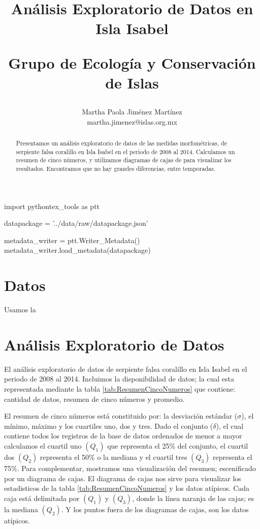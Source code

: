 \documentclass{article}
\begin{document}
 

\author{Martha Paola Jiménez Martínez \\ 
\small{martha.jimenez@islas.org.mx}} 
\title{Análisis Exploratorio de Datos en Isla Isabel \\
\begin{large} Grupo de Ecología y Conservación de Islas \end{large}}  

\maketitle

\begin{abstract}
Presentamos un análisis exploratorio de datos de las medidas morfométricas, de serpiente falsa
coralillo en Isla  Isabel en el periodo de 2008 al 2014. Calculamos un resumen de cinco números, y
utilizamos diagramas de cajas de para visualizar los resultados. Encontramos que no hay grandes
diferencias, entre temporadas.
\end{abstract}

\begin{pycode}
import pythontex_tools as ptt

datapackage = '../data/raw/datapackage.json'

metadata_writer = ptt.Writer_Metadata()
metadata_writer.load_metadata(datapackage)

\end{pycode}

\section*{Datos}
Usamos la 

\section*{Análisis Exploratorio de Datos}
El análisis exploratorio de datos de serpiente falsa coralillo en Isla Isabel en el periodo de 2008
al 2014. Incluimos la disponibilidad de datos; la cual esta representada mediante la tabla
\ref{tab:ResumenCincoNumeros} que contiene: cantidad de datos, resumen de cinco números y promedio.

El resumen de cinco números está constituido por: la desviación estándar ($\sigma$), el mínimo,
máximo y los cuartiles uno, dos y tres. Dado el conjunto
($\delta$), el cual contiene todos los registros de la base de datos ordenados de menor a mayor
calculamos el cuartil uno $(Q_1)$ que representa el 25\% del conjunto, el cuartil
dos $(Q_2)$ representa el 50\% o la mediana y el cuartil tres $(Q_3)$ representa el 75\%.
Para complementar, mostramos una visualización del resumen; escenificado por un diagrama de cajas. 
El diagrama de cajas nos sirve para visualizar los estadisticos de la tabla
\ref{tab:ResumenCincoNumeros} y los datos atípicos. Cada caja está delimitada por $(Q_1)$ y $(Q_3)$,
donde la línea naranja de las cajas; es la mediana $(Q_2)$. Y los puntos fuera de los diagramas
de cajas, son los datos atípicos.
\end{document}
